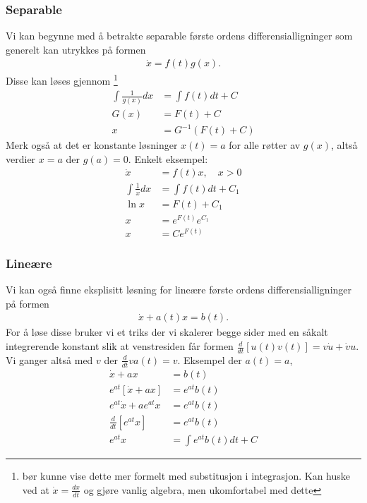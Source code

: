 \subsubsection{Separable}
Vi kan begynne med å betrakte separable første ordens differensialligninger som generelt kan utrykkes på formen
\begin{align}
\dot{x}=f(t)g(x).
\end{align}
Disse kan løses gjennom \footnote{bør kunne vise dette mer formelt med substitusjon i integrasjon. Kan huske ved at $\dot{x}=\frac{dx}{dt}$ og gjøre vanlig algebra, men ukomfortabel med dette}
\begin{align}
\int\frac{1}{g(x)}dx &= \int f(t)dt + C \\
G(x) &= F(t) + C \\
x &= G^{-1}(F(t)+C)
\end{align}
Merk også at det er konstante løsninger $x(t)=a$ for alle røtter av $g(x)$, altså verdier $x=a$ der $g(a)=0$. Enkelt eksempel:
\begin{align}
\dot{x}&=f(t)x, \quad x>0 \\
\int \frac{1}{x}dx &= \int f(t)dt + C_1 \\
\ln x &= F(t)+C_1 \\
x &= e^{F(t)}e^{C_1} \\
x &= Ce^{F(t)} 
\end{align}
\subsubsection{Lineære}
Vi kan også finne eksplisitt løsning for lineære første ordens differensialligninger på formen
\begin{align}
\dot{x}+a(t)x=b(t).
\end{align}
For å løse disse bruker vi et triks der vi skalerer begge sider med en såkalt integrerende konstant slik at venstresiden får formen $\frac{d}{dt}[u(t)v(t)] = v\dot{u}+\dot{v}u$. Vi ganger altså med $v$ der $\frac{d}{dt}va(t)=v$.  Eksempel der $a(t)=a$,
\begin{align}
\dot{x}+ax&=b(t) \\
e^{at}[\dot{x}+ax]&=e^{at}b(t) \\
e^{at}\dot{x}+ae^{at}x &=e^{at}b(t) \\
\frac{d}{dt}[e^{at}x] &= e^{at}b(t) \\
e^{at}x &= \int e^{at}b(t)dt + C
\end{align}